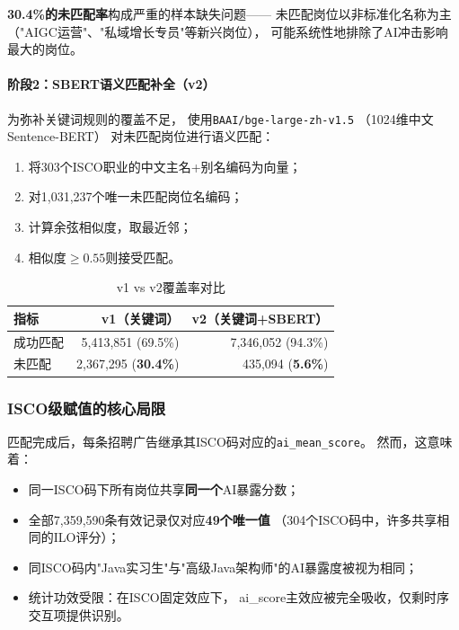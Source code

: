 \documentclass[12pt,a4paper]{ctexart}
\begin{document}
\textbf{30.4\%的未匹配率}构成严重的样本缺失问题——
未匹配岗位以非标准化名称为主
（"AIGC运营"、"私域增长专员"等新兴岗位），
可能系统性地排除了AI冲击影响最大的岗位。

\paragraph{阶段2：SBERT语义匹配补全（v2）}

为弥补关键词规则的覆盖不足，
使用\texttt{BAAI/bge-large-zh-v1.5}
（1024维中文Sentence-BERT）
对未匹配岗位进行语义匹配：
\begin{enumerate}
\item 将303个ISCO职业的中文主名+别名编码为向量；
\item 对1,031,237个唯一未匹配岗位名编码；
\item 计算余弦相似度，取最近邻；
\item 相似度$\geq 0.55$则接受匹配。
\end{enumerate}

\begin{table}[h!]
\centering
\caption{v1 vs v2覆盖率对比}
\begin{tabular}{lrr}
\toprule
指标 & v1（关键词） & v2（关键词+SBERT） \\
\midrule
成功匹配 & 5,413,851 (69.5\%) & 7,346,052 (94.3\%) \\
未匹配 & 2,367,295 (\textbf{30.4\%}) & 435,094 (\textbf{5.6\%}) \\
\bottomrule
\end{tabular}
\end{table}

\subsubsection{ISCO级赋值的核心局限}

匹配完成后，每条招聘广告继承其ISCO码对应的\texttt{ai\_mean\_score}。
然而，这意味着：
\begin{itemize}
\item 同一ISCO码下所有岗位共享\textbf{同一个}AI暴露分数；
\item 全部7,359,590条有效记录仅对应\textbf{49个唯一值}
      （304个ISCO码中，许多共享相同的ILO评分）；
\item 同ISCO码内"Java实习生"与"高级Java架构师"的AI暴露度被视为相同；
\item 统计功效受限：在ISCO固定效应下，
      ai\_score主效应被完全吸收，仅剩时序交互项提供识别。
\end{itemize}
\end{document}
